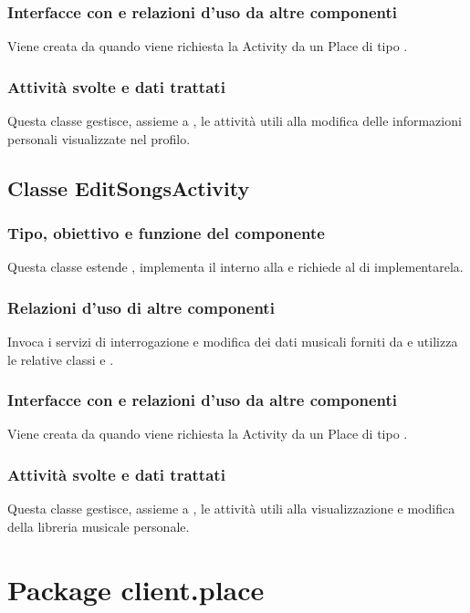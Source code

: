 \subsubsection*{Interfacce con e relazioni d'uso da altre componenti}
Viene creata da  quando viene richiesta la Activity da
un Place di tipo .
\subsubsection*{Attivit\`a svolte e dati trattati}
Questa classe gestisce, assieme a , le attivit\`a utili alla
modifica delle informazioni personali visualizzate nel profilo.

\subsection{Classe EditSongsActivity}
\subsubsection*{Tipo, obiettivo e funzione del componente}
Questa classe estende , implementa il 
interno alla  e richiede al  di
implementarela.
\subsubsection*{Relazioni d'uso di altre componenti} Invoca i servizi di
interrogazione e modifica dei dati musicali forniti da  e
utilizza le relative classi  e .
\subsubsection*{Interfacce con e relazioni d'uso da altre componenti}
Viene creata da  quando viene richiesta la Activity da
un Place di tipo .
\subsubsection*{Attivit\`a svolte e dati trattati}
Questa classe gestisce, assieme a , le attivit\`a utili alla
visualizzazione e modifica della libreria musicale personale.

\newpage
\section{Package client.place} %
